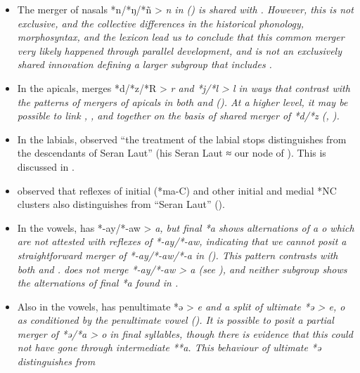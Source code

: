 \begin{itemize}
		\item	The merger of nasals *n/*ŋ/*ñ > \it{n} in  ()
					is shared with .
					However, this is not exclusive,
					and the collective differences in the historical phonology,
					morphosyntax, and the lexicon lead us to conclude that this
					common merger very likely happened through parallel development,
					and is not an exclusively shared innovation defining a larger
					subgroup that includes .
		\item	In the apicals,
					 merges *d/*z/*R > \it{r}
					and *j/*l > \it{l} in ways that contrast with the patterns of
					mergers of apicals in both  and  ().
					At a higher level,
					it may be possible to link ,
					, and  together on the basis
					of shared merger of *d/*z (, ).
		\item	In the labials,
					\citet[133]{Collins1986} observed “the treatment of the labial
					stops distinguishes  from the descendants of Seran Laut”
					(his Seran Laut ≈ our  node of ).
					This is discussed in .
		\item	\citet[133f]{Collins1986} observed that reflexes of initial
					(*ma-C) and other initial and medial *NC clusters also distinguishes
					 from “Seran Laut” ().
		\item	In the vowels,
					 has *-ay/*-aw > \it{a},
					but final *a shows alternations of \it{a {\tl} o} which are not
					attested with reflexes of *-ay/*-aw,
					indicating that we cannot posit a straightforward merger of *-ay/*-aw/*-a in  ().
					This pattern contrasts with both  and .
					 does not merge *-ay/*-aw > \it{a} (see ),
					and neither subgroup shows the alternations of final *a found in .
		\item	Also in the vowels,
					 has penultimate *ə > \it{e}
					and a split of ultimate *ə > \it{e,
					o} as conditioned by the penultimate vowel ().
					It is possible to posit a partial merger of *ə/*a > \it{o} in
					final syllables, though there is evidence that this could not have gone through intermediate **a.
					This behaviour of ultimate *ə distinguishes  from 

\end{itemize}
